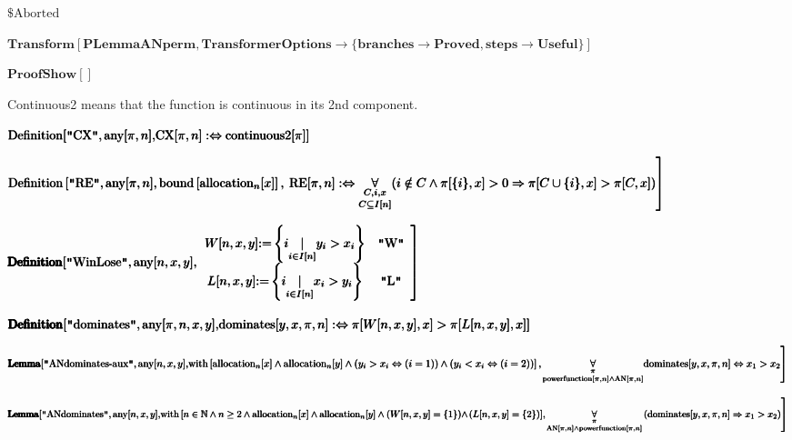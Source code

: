 \documentclass{article}
\begin{document}
\noindent\(\text{$\$$Aborted}\)

\noindent\(\pmb{\text{Transform}[\text{PLemmaANperm},\text{TransformerOptions}\to \{\text{branches}\to \text{Proved},\text{steps}\to \text{Useful}\}]}\)

\noindent\(\pmb{\text{ProofShow}[]}\)

Continuous2 means that the function is continuous in its 2nd component.

\noindent\(\pmb{\text{Definition}[\text{$\texttt{"}$CX$\texttt{"}$}, \text{any}[\pi ,n],}\\
\pmb{\text{CX}[\pi ,n] :\Leftrightarrow  \text{continuous2}[\pi ]]}\)

\noindent\(\pmb{\text{Definition}\left[\text{$\texttt{"}$RE$\texttt{"}$}, \text{any}[\pi ,n],\text{bound}\left[\text{allocation}_n[x]\right],\right.}\\
\pmb{\left.\text{RE}[\pi ,n] :\Leftrightarrow  \underset{C\subseteq I[n]}{\underset{C,i,x}{\forall }}(i\notin C \land  \pi [\{i\},x]>0 \Rightarrow
 \pi [C\cup \{i\},x]>\pi [C,x])\right]}\)

\noindent\(\pmb{}\\
\pmb{\pmb{\text{Definition}}[\text{$\texttt{"}$WinLose$\texttt{"}$}, \text{any}[n,x,y],}\\
\pmb{\left.
\begin{array}{cc}
 W[n,x,y] \text{:=} \left\{i\underset{i\in I[n]}{|}y_i>x_i\right\} & \text{$\texttt{"}$W$\texttt{"}$} \\
 L[n,x,y] \text{:=} \left\{i\underset{i\in I[n]}{|}x_i>y_i\right\} & \text{$\texttt{"}$L$\texttt{"}$}
\end{array}
\right]}\)

\noindent\(\pmb{\pmb{\text{Definition}}[\text{$\texttt{"}$dominates$\texttt{"}$}, \text{any}[\pi ,n,x, y],}\\
\pmb{\text{dominates}[y,x,\pi ,n] :\Leftrightarrow  \pi [W[n,x,y],x] > \pi [L[n,x,y],x]]}\)

\noindent\(\pmb{\pmb{\text{Lemma}}[\text{$\texttt{"}$ANdominates-aux$\texttt{"}$},\text{any}[n,x,y],}\\
\pmb{\text{with}\left[\text{allocation}_n[x] \land \text{allocation}_n[y]\land \left(y_i>x_i\Leftrightarrow (i=1)\right)\land \left(y_i<x_i\Leftrightarrow
(i=2)\right)\right],}\\
\pmb{\left.\underset{\text{powerfunction}[\pi ,n]\land \text{AN}[\pi ,n]}{\underset{\pi }{\forall }}\text{dominates}[y,x, \pi ,n] \Leftrightarrow
 x_1> x_2\right]}\)

\noindent\(\pmb{\pmb{\text{Lemma}}[\text{$\texttt{"}$ANdominates$\texttt{"}$},\text{any}[n,x,y],}\\
\pmb{\text{with}\left[n\in \mathbb{N}\land n\geq 2\land \text{allocation}_n[x] \land \text{allocation}_n[y]\land (W[n,x,y]=\{1\})\land \right.}\\
\pmb{(L[n,x,y]=\{2\})],}\\
\pmb{\left.\underset{\text{AN}[\pi ,n]\land \text{powerfunction}[\pi ,n]}{\underset{\pi }{\forall }}\left(\text{dominates}[y,x, \pi ,n] \Rightarrow
 x_1> x_2\right)\right]}\)
\end{document}
